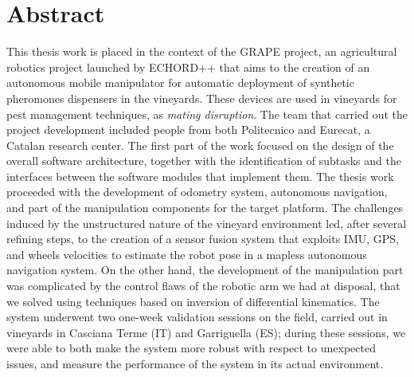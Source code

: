 
\begingroup
\let\clearpage\relax
\let\cleardoublepage\relax
\let\cleardoublepage\relax

\chapter*{Abstract}
This thesis work is placed in the context of the \acs{GRAPE} project, an agricultural robotics project launched by \acs{ECHORD++} that aims to the creation of an autonomous mobile manipulator for automatic deployment of synthetic pheromones dispensers in the vineyards. These devices are used in vineyards for pest management techniques, as \textit{mating disruption}. The team that carried out the project development included people from both  Politecnico and Eurecat, a Catalan research center. The first part of the work focused on the design of the overall software architecture, together with the identification of subtasks and the interfaces between the software modules that implement them. The thesis work proceeded with the development of odometry system, autonomous navigation, and part of the manipulation components for the target platform. The challenges induced by the unstructured nature of the vineyard environment led, after several refining steps, to the creation of a sensor fusion system that exploits \acs{IMU}, GPS, and wheels velocities to estimate the robot pose in a mapless autonomous navigation system. On the other hand, the development of the manipulation part was complicated by the control flaws of the robotic arm we had at disposal, that we solved using techniques based on inversion of differential kinematics. The system underwent two one-week validation sessions on the field, carried out in vineyards in Casciana Terme (IT) and Garriguella (ES); during these sessions, we were able to  both make the system more robust with respect to unexpected issues, and measure the performance of the system in its actual environment.

\vfill
\newpage
{}

